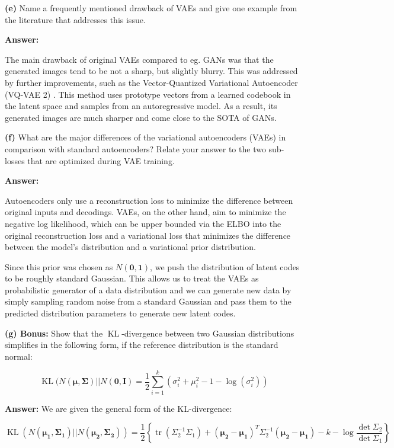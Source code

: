 \textbf{(e)} Name a frequently mentioned drawback of VAEs and give one example from the literature that addresses this issue.

\textbf{Answer:}

The main drawback of original VAEs compared to eg. GANs was that the generated images tend to be not a sharp, but slightly blurry. This was addressed by further improvements, such as the Vector-Quantized Variational Autoencoder (VQ-VAE 2) \cite{razavi19}. This method uses prototype vectors from a learned codebook in the latent space and samples from an autoregressive model. As a result, its generated images are much sharper and come close to the SOTA of GANs.

\textbf{(f)} What are the major differences of the variational autoencoders (VAEs) in comparison with standard autoencoders? Relate your answer to the two sub-losses that are optimized during VAE training.

\textbf{Answer:}

Autoencoders only use a reconstruction loss to minimize the difference between original inputs and decodings. VAEs, on the other hand, aim to minimize the negative log likelihood, which can be upper bounded via the ELBO into the original reconstruction loss and a variational loss that minimizes the difference between the model's distribution and a variational prior distribution.

Since this prior was chosen as $N(\mathbf{0}, \mathbf{1})$, we push the distribution of latent codes to be roughly standard Gaussian. This allows us to treat the VAEs as probabilistic generator of a data distribution and we can generate new data by simply sampling random noise from a standard Gaussian and pass them to the predicted distribution parameters to generate new latent codes. 

\textbf{(g) Bonus:} Show that the $\operatorname{KL}$-divergence between two Gaussian distributions simplifies in the following form, if the reference distribution is the standard normal:

\begin{equation}
	\operatorname{KL}(N(\mathbf{\mu}, \mathbf{\Sigma})|| N(\mathbf{0}, \mathbf{I}) = \frac{1}{2} \sum_{i=1}^k \left(\sigma_i^2 + \mu_i^2 - 1 - \log(\sigma_i^2) \right)
\end{equation}

\textbf{Answer: } We are given the general form of the KL-divergence:

\begin{equation}
	\operatorname{KL}(N(\mathbf{\mu_1}, \mathbf{\Sigma_1})||N(\mathbf{\mu_2}, \mathbf{\Sigma_2}))  = \frac{1}{2} \left\{ \operatorname{tr}(\Sigma_2^{-1}  \Sigma_1) + (\mathbf{\mu_2} - \mathbf{\mu_1})^T \Sigma_2^{-1} (\mathbf{\mu_2} - \mathbf{\mu_1}) - k - \log \frac{\det \Sigma_2}{\det \Sigma_1} \right\}
\end{equation}

